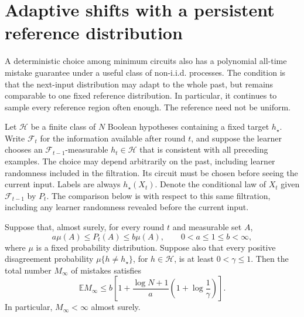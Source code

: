 \section{Adaptive shifts with a persistent reference distribution}
\label{sec:reference-shifts}

A deterministic choice among minimum circuits also has a polynomial
all-time mistake guarantee under a useful class of non-i.i.d. processes.
The condition is that the next-input distribution may adapt to the whole
past, but remains comparable to one fixed reference distribution.  In
particular, it continues to sample every reference region often enough.
The reference need not be uniform.

Let $\mathcal H$ be a finite class of $N$ Boolean hypotheses containing a
fixed target $h_\star$.  Write $\mathcal F_t$ for the information available
after round $t$, and suppose the learner chooses an
$\mathcal F_{t-1}$-measurable $h_t\in\mathcal H$ that is consistent with
all preceding examples.  The choice may depend arbitrarily on the past,
including learner randomness included in the filtration.  Its circuit
must be chosen before seeing the current input.  Labels are always
$h_\star(X_t)$.  Denote the conditional law of $X_t$ given $\mathcal F_{t-1}$ by $P_t$.
The comparison below is with respect to this same filtration, including
any learner randomness revealed before the current input.

\begin{proposition}
\label{prop:adaptive-reference}
Suppose that, almost surely, for every round $t$ and measurable set $A$,
\[
 a\mu(A)\le P_t(A)\le b\mu(A),
 \qquad 0<a\le1\le b<\infty,
\]
where $\mu$ is a fixed probability distribution.  Suppose also that every
positive disagreement probability
$\mu\{h\ne h_\star\}$, for $h\in\mathcal H$, is at least $0<\gamma\le1$.
Then the total number $M_\infty$ of mistakes satisfies
\[
 \mathbb E M_\infty
 \le b\left[1+\frac{\log N+1}{a}
                    \left(1+\log\frac1\gamma\right)\right].
\]
In particular, $M_\infty<\infty$ almost surely.
\end{proposition}

